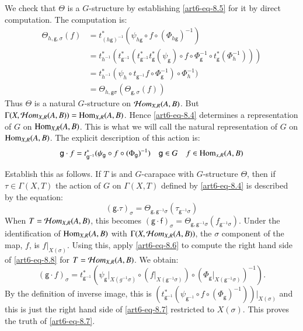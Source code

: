 We check that $\Theta$ is a $G$-structure by establishing \ref{art6-eq-8.5} for it by direct computation. The computation is:
\begin{align*}
\Theta_{h, \mathsf{g}, \sigma}(f) &= t_{(h \mathsf{g})^{-1}}^{*}(\psi_{h \mathsf{g}} \circ f \circ (\Phi_{h \mathsf{g}})^{-1})\\
& = t_{h^{-1}}^{*}(t_{\mathsf{g^{-1}}}^{*}(t_{\mathsf{g^{-1}}}^{*} t_{\mathsf{g}}^{*} (\psi_{\mathsf{g}}) \circ f \circ \Phi_{\mathsf{g}}^{-1} \circ t_{\mathsf{g}}^{*}(\Phi_{h}^{-1})))\\
& = t_{h^{-1}}^{*}(\psi_{h} \circ t_{\mathsf{g}^{-1}} f \circ \Phi_{\mathsf{g}}^{-1}) \circ \Phi_{h}^{-1})\\
& = \Theta_{h,\mathsf{g}\sigma}(\Theta_{\mathsf{g}, \sigma}(f))
\end{align*}
Thus $\Theta$ is a natural $G$-structure on $\mathcal{H} om_{X, R}(A, B)$. But\break $\Gamma(X, \mathcal{H} om_{X, R}(A, B)) = \operatorname{Hom}_{X, R}(A, B)$. Hence \ref{art6-eq-8.4} determines a representation of $G$ on $\operatorname{Hom}_{X, R}(A, B)$. This is what we will call the natural representation of $G$ on $\operatorname{Hom}_{X, R}(A, B)$. The explicit description of this action is:
\begin{equation}\label{art6-eq-8.7}
\mathsf{g} \cdot f = t_{\mathsf{g}^{-1}}^{*}(\psi_{\mathsf{g}} \circ f \circ (\Phi_{\mathsf{g}})^{-1}) \quad \mathsf{g} \in G \quad f\in \operatorname{Hom}_{x, R}(A, B)
\end{equation}

Establish this as follows. If $T$ is and $G$-carapace with $G$-structure $\Theta$, then if $\tau \in \Gamma (X, T)$ the action of $G$ on $\Gamma(X, T)$ defined by \ref{art6-eq-8.4} is described by the equation:
\begin{equation}\label{art6-eq-8.8}
(\mathsf{g}. \tau)_{\sigma} = \Theta_{\mathsf{g}, \mathsf{g}^{-1}\sigma}(\tau_{\mathsf{g}^{-1}\sigma})
\end{equation}
When $T=\mathcal{H} om_{X, R}(A, B)$, this becomes $(\mathsf{g \cdot f})_{\sigma} = \Theta_{\mathsf{g}, \mathsf{g}^{-1}\sigma}(f_{\mathsf{g}^{-1}\sigma})$. Under the identification of $\operatorname{Hom}_{X, R}(A, B)$ with
$\Gamma(X, \mathcal{H} om_{X, R}(A, B))$, the $\sigma$ component of the map, $f$, is $f|_{X(\sigma)}$. Using this, apply
\ref{art6-eq-8.6} to compute the right hand side of \ref{art6-eq-8.8} for $T= \mathcal{H} om_{X, R}(A, B)$. We obtain:
$$
(\mathsf{g} \cdot f)_{\sigma} = t_{\mathsf{g}^{-1}}^{*}(\psi_{\mathsf{g}}|_{X(g^{-1}\sigma)} \circ (f|_{X(\mathsf{g}^{-1}\sigma)})\circ (\Phi_{\mathsf{g}}|_{X(\mathsf{g}^{-1}\sigma)})^{-1}).
$$
By the definition of inverse image, this is $(t_{\mathsf{g}^{-1}}^{*}(\psi_{\mathsf{g}^{-1}} \circ f \circ (\Phi_{\mathsf{g}})^{-1}))|_{X(\sigma)}$ and this is just the right hand side of \ref{art6-eq-8.7} restricted to $X(\sigma)$. This proves the truth of \ref{art6-eq-8.7}.

